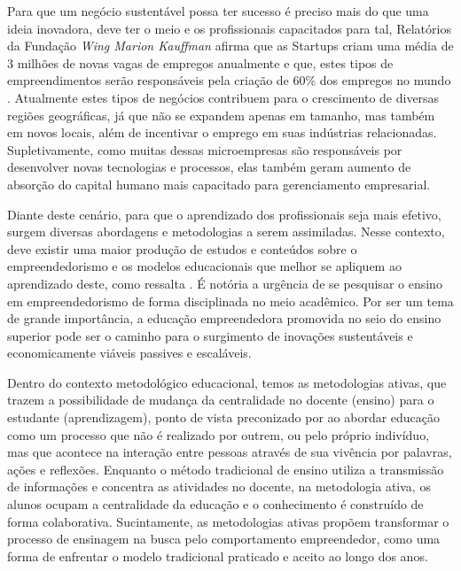 Para que um negócio sustentável possa ter sucesso é preciso mais do que uma ideia inovadora, deve ter o meio e os profissionais capacitados para tal, Relatórios da Fundação \textit{Wing Marion Kauffman} afirma que as Startups criam uma média de 3 milhões de novas vagas de empregos anualmente e que, estes tipos de empreendimentos serão responsáveis pela criação de 60\% dos empregos no  mundo  \cite{brasil_o_2017}. 
Atualmente estes tipos de  negócios contribuem para o crescimento de diversas regiões geográficas, já que não se expandem apenas em tamanho, mas também em novos locais, além de incentivar o emprego em suas indústrias relacionadas. Supletivamente, como muitas dessas microempresas são responsáveis por desenvolver novas tecnologias e processos, elas também geram aumento de absorção do capital humano mais capacitado para gerenciamento empresarial.

Diante deste cenário, para que o aprendizado dos profissionais seja mais efetivo, surgem diversas abordagens e metodologias a serem assimiladas. Nesse contexto, deve existir uma maior produção de estudos e conteúdos sobre o empreendedorismo e os modelos educacionais que melhor se apliquem ao aprendizado deste, como ressalta . É notória a urgência de se pesquisar o ensino em empreendedorismo de forma disciplinada no meio acadêmico. Por ser um tema de grande importância, a educação empreendedora promovida no seio do ensino superior pode ser o caminho para o surgimento de inovações sustentáveis e economicamente viáveis passives e escaláveis.

Dentro do contexto metodológico educacional, temos as metodologias ativas, que trazem a possibilidade de mudança da centralidade no docente (ensino) para o estudante (aprendizagem), ponto de vista preconizado por  ao abordar educação como um processo que não é realizado por outrem, ou pelo próprio indivíduo, mas que acontece na interação entre pessoas através de sua vivência por palavras, ações e reflexões. 
Enquanto o método tradicional de ensino utiliza a transmissão de informações e concentra as atividades no docente, na metodologia ativa, os alunos ocupam a centralidade da educação e o conhecimento é construído de forma colaborativa. Sucintamente, as metodologias ativas propõem transformar o processo de ensinagem na busca pelo comportamento empreendedor, como uma forma de enfrentar o modelo tradicional praticado e aceito ao longo dos anos.
 
